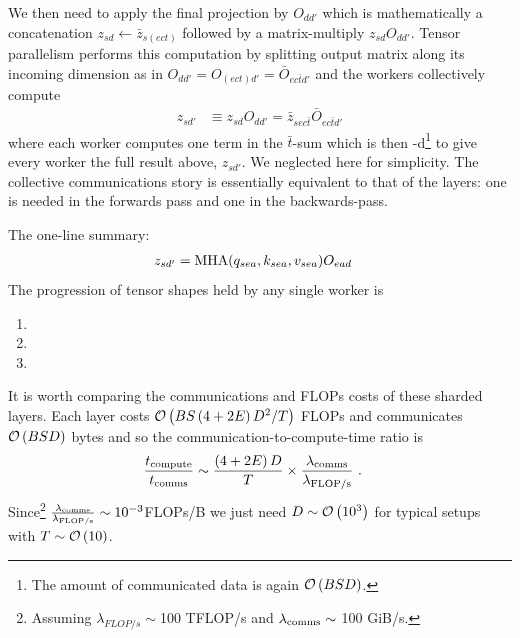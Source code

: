 \documentclass[11pt]{article}
\begin{document}
We then need to apply the final projection by $ O _{ d d' } $ which is mathematically a concatenation
$ z _{ sd }  \leftarrow \bar{z} _{ s(ect) } $ followed by a matrix-multiply $ z _{ sd }O _{ d d' }
$. Tensor parallelism performs this computation by splitting output matrix along its
incoming dimension as in $ O _{ d d'  } = O _{ (ect) d' } = \bar{O} _{ e c \bar{t} d' }$ and the workers
collectively compute
\begin{align}
z _{ sd' }&\equiv  z _{ sd }O _{ d d' } = \bar{z} _{ sec \bar{t} } \bar{O} _{ ec \bar{t}d' }
\end{align}
where each worker computes one term in the $ \bar{t} $-sum which is then
-d\footnote{The amount of communicated data is again $ \mathcal{O} \left( BSD
\right)$. } to give every worker the full result above, $z _{ sd'}$. We neglected
 here for simplicity. The collective communications story is essentially
equivalent to that of the  layers: one  is needed in the forwards pass
and one  in the backwards-pass.

The one-line summary:
\begin{align}
    z _{ sd' }  &= {\rm  MHA}(q _{ sea }, k _{ sea }, v _{ sea }) O _{ ead }
\end{align}
The progression of tensor shapes held by any single worker is
\begin{enumerate}
    \item {}
    \item {}
    \item {}
\end{enumerate}


It is worth comparing the communications and FLOPs costs of these sharded layers. Each layer costs
$ \mathcal{O} \left(    BS \left ( 4+2E \right )  D ^{ 2 }/T \right)$ FLOPs and communicates
$ \mathcal{O} \left( BSD \right)  $ bytes and so the communication-to-compute-time ratio is
\begin{align}
  \frac{ t _{ {\rm  compute} } }{ t _{ {\rm  comms} } } & \sim  \frac{ \left ( 4+2E \right) D }{ T }\times \frac{ \lambda _{ {\rm comms} }  }{ \lambda _{ {\rm FLOP/s} }} \ .
\end{align}
Since\footnote{Assuming $ \lambda _{ FLOP/s }\sim  $100 TFLOP/s and $ \lambda _{ {\rm comms} } \sim
$ 100 GiB/s.} $ \frac{ \lambda _{ {\rm comms} }  }{ \lambda _{ {\rm FLOP/s} }} \sim 10 ^{ -3 }
$FLOPs/B we just need $ D \sim \mathcal{O} \left( 10 ^{ 3 } \right)   $ for typical setups with $ T \sim
\mathcal{O} \left( 10 \right)  $.
\end{document}

